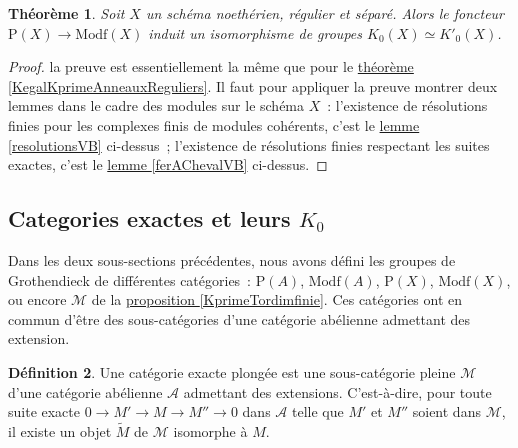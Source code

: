 \documentclass{amsart}
\newcommand{\sref}[2]{\hyperref[#2]{#1 \ref*{#2}}}
\theoremstyle{plain}
\newtheorem{theo}{Théorème}[section]
\theoremstyle{definition}
\newtheorem{defi}[theo]{Définition}
\theoremstyle{remark}
\newcommand{\M}{\mathcal{M}}
\newcommand{\A}{\mathcal{A}}
\newcommand{\Proj}[1]{\mathrm{P}({#1})}
\newcommand{\Modf}[1]{\mathrm{Modf}({#1})}
\newcommand{\ra}{\rightarrow}
\newcommand{\exa}[3]{0\ra {#1}\ra {#2}\ra {#3}\ra 0}
\begin{document}
\begin{theo}
  Soit $X$ un schéma noethérien, régulier et séparé. Alors le foncteur $\Proj{X}\ra \Modf{X}$ induit un isomorphisme de groupes
  $K_0(X)\simeq K'_0(X)$.
\end{theo}

\begin{proof}
  la preuve est essentiellement la même que pour le \sref{théorème}{KegalKprimeAnneauxReguliers}. Il faut pour appliquer la preuve montrer deux
  lemmes dans le cadre des modules sur le schéma $X$~: l'existence de résolutions finies pour les complexes finis de modules cohérents, c'est le
  \sref{lemme}{resolutionsVB} ci-dessus~; l'existence de résolutions finies respectant les suites exactes, 
  c'est le \sref{lemme}{ferAChevalVB} ci-dessus.
\end{proof}


\subsection{\texorpdfstring{Categories exactes et leurs $K_0$}{Categories exactes et leurs K0}}

Dans les deux sous-sections précédentes, nous avons défini les groupes de Grothendieck de différentes catégories~:
$\Proj{A}$, $\Modf{A}$, $\Proj{X}$, $\Modf{X}$, ou encore $\mathcal{M}$ de la \sref{proposition}{KprimeTordimfinie}.
Ces catégories ont en commun d'être des sous-catégories d'une catégorie abélienne admettant des extension.

\begin{defi}
  Une catégorie exacte plongée est une sous-catégorie pleine $\M$ d'une catégorie abélienne $\A$ admettant des extensions. C'est-à-dire, pour 
  toute suite exacte $\exa{M'}{M}{M''}$ dans $\A$ telle que $M'$ et $M''$ soient dans $\M$, il existe un objet $\tilde{M}$ de $\M$ isomorphe à $M$.
\end{defi}
\end{document}
